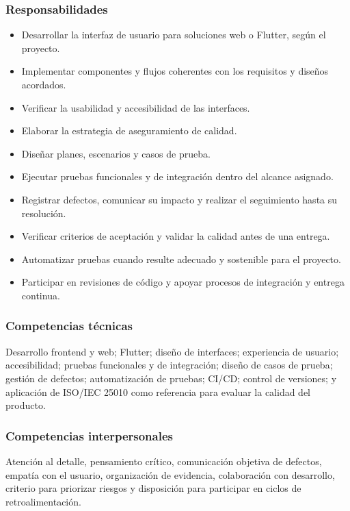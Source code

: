 \subsubsection{Responsabilidades}
\begin{itemize}
  \item Desarrollar la interfaz de usuario para soluciones web o Flutter, según el proyecto.
  \item Implementar componentes y flujos coherentes con los requisitos y diseños acordados.
  \item Verificar la usabilidad y accesibilidad de las interfaces.
  \item Elaborar la estrategia de aseguramiento de calidad.
  \item Diseñar planes, escenarios y casos de prueba.
  \item Ejecutar pruebas funcionales y de integración dentro del alcance asignado.
  \item Registrar defectos, comunicar su impacto y realizar el seguimiento hasta su resolución.
  \item Verificar criterios de aceptación y validar la calidad antes de una entrega.
  \item Automatizar pruebas cuando resulte adecuado y sostenible para el proyecto.
  \item Participar en revisiones de código y apoyar procesos de integración y entrega continua.
\end{itemize}

\subsubsection{Competencias técnicas}

Desarrollo frontend y web; Flutter; diseño de interfaces; experiencia de usuario;
accesibilidad; pruebas funcionales y de integración; diseño de casos de prueba;
gestión de defectos; automatización de pruebas; CI/CD; control de versiones; y
aplicación de ISO/IEC 25010 como referencia para evaluar la calidad del producto.

\subsubsection{Competencias interpersonales}

Atención al detalle, pensamiento crítico, comunicación objetiva de defectos,
empatía con el usuario, organización de evidencia, colaboración con desarrollo,
criterio para priorizar riesgos y disposición para participar en ciclos de
retroalimentación.

